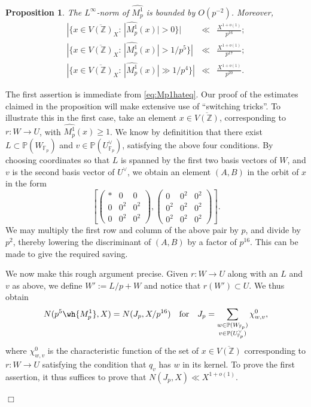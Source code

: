 \documentclass{article}
\def\Z{{\mathbb Z}}
\def\P{{\mathbb P}}
\def\F{{\mathbb F}}
\def\Z{{\mathbb Z}}
\def\P{{\mathbb P}}
\def\F{{\mathbb F}}
\def\ol{\overline}
\newtheorem{proposition}[theorem]{Proposition}
\newenvironment{proof}{\noindent {\bf Proof:}}{$\Box$ \vspace{2 ex}}
\begin{document}
\begin{proposition}\label{prop:M1phatbound}
The $L^\infty$-norm of $\widehat{M_p^1}$ is bounded by $O(p^{-2})$. Moreover,
\begin{equation*}
\begin{array}{rcl}
|\{x\in\ol{V(\Z)}_X:\,|\widehat{M_p^1}(x)|>0\}|
&\ll& \displaystyle\frac{X^{1+o(1)}}{p^{16}}; \\[.15in]
|\{x\in\ol{V(\Z)}_X:\,|\widehat{M_p^1}(x)|> 1/p^5\}|
&\ll& \displaystyle\frac{X^{1+o(1)}}{p^{17}}; \\[.15in]
|\{x\in\ol{V(\Z)}_X:\,|\widehat{M_p^1}(x)|\gg 1/p^4\}|
&\ll& \displaystyle\frac{X^{1+o(1)}}{p^{20}}. 
\end{array}
\end{equation*}    
\end{proposition}
\begin{proof}
The first assertion is immediate from \eqref{eq:Mp1hateq}.
Our proof of the estimates claimed in the proposition will make extensive use of ``switching tricks''. To illustrate this in the first case, take an element $x\in \ol{V(\Z)}$, corresponding to $r:W\to U$, with $\widehat{M_p^1}(x)\geq 1$. We know by definitition that there exist $L\subset \P(W_{\F_p})$ and $v\in\P(U_{\F_p}^\vee)$, satisfying the above four conditions. By choosing coordinates so that $L$ is spanned by the first two basis vectors of $W$, and $v$ is the second basis vector of $U^\vee$, we obtain an element $(A,B)$ in the orbit of $x$ in the form
\begin{equation*}
\left[\begin{pmatrix}{*}&{0}&{0}\\{0}&{0^2}&{0^2}\\{0}&{0^2}&{0^2}\end{pmatrix},\begin{pmatrix} {0}&0^2&0^2\\0^2&{0^2}&{0^2}\\0^2&{0^2}&{0^2}\end{pmatrix}\right].
\end{equation*}
We may multiply the first row and column of the above pair by $p$, and divide by $p^2$, thereby lowering the discriminant of $(A,B)$ by a factor of $p^{16}$. This can be made to give the required saving. 


We now make this rough argument precise. Given $r:W\to U$ along with an $L$ and $v$ as above, we define $W':=L/p+W$ and notice that $r(W')\subset U$. We thus obtain
\begin{equation*}
N(p^5\wh{M_p^1},X)=N(J_p,X/p^{16}) \quad {\rm for}\quad
J_p= \sum_{\substack{w\in \P(W_{\F_p})\\ v\in \P(U^{\vee}_{\F_p})}}\chi^0_{w,v},
\end{equation*}
where $\chi^0_{w,v}$ is the characteristic function of the set of $x\in\ol{V(\Z)}$ corresponding to $r:W\to U$ satisfying the condition that $q_v$ has $w$ in its kernel. To prove the first assertion, it thus suffices to prove that $N(J_p,X)\ll X^{1+o(1)}$.


\end{proof}
\end{document}
